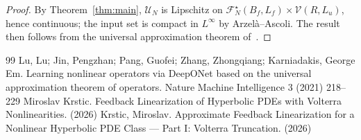 \documentclass[10pt,a4paper]{amsart}
\newcommand{\Linf}{L^\infty}
\begin{document}
\begin{proof}
By Theorem~\ref{thm:main}, $\mathcal{U}_N$ is Lipschitz on $\mathcal{F}_N^\star(B_f,L_f)\times\mathcal{V}(R,L_u)$, hence continuous; the input set is compact in $\Linf$ by Arzel\`a--Ascoli. The result then follows from the universal approximation theorem of~\cite{Lu2021Universal}.
\end{proof}


\begin{thebibliography}{99}
 Lu, Lu; Jin, Pengzhan; Pang, Guofei; Zhang, Zhongqiang; Karniadakis, George Em. Learning nonlinear operators via {DeepONet} based on the universal approximation theorem of operators. Nature Machine Intelligence 3 (2021) 218--229
 Miroslav Krstic. Feedback Linearization of Hyperbolic PDEs with Volterra Nonlinearities. (2026)
 Krstic, Miroslav. Approximate Feedback Linearization for a Nonlinear Hyperbolic {PDE} Class --- {Part I}: {Volterra} Truncation. (2026)
\end{thebibliography}
\end{document}
